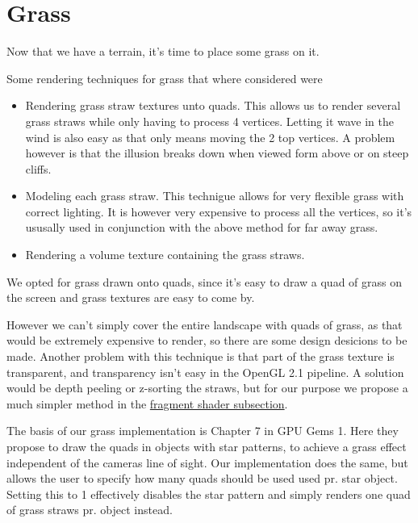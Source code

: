 \chapter{Grass}


Now that we have a terrain, it's time to place some grass on it.

Some rendering techniques for grass that where considered were

\begin{itemize}
\item Rendering grass straw textures unto quads. This allows us to
  render several grass straws while only having to process 4
  vertices. Letting it wave in the wind is also easy as that only
  means moving the 2 top vertices. A problem however is that the
  illusion breaks down when viewed form above or on steep cliffs.
\item Modeling each grass straw. This technigue allows for very
  flexible grass with correct lighting. It is however very expensive
  to process all the vertices, so it's ususally used in conjunction
  with the above method for far away grass.
\item Rendering a volume texture containing the grass straws.
\end{itemize}

We opted for grass drawn onto quads, since it's easy to draw a quad of
grass on the screen and grass textures are easy to come by.

However we can't simply cover the entire landscape with quads of
grass, as that would be extremely expensive to render, so there are
some design desicions to be made. Another problem with this technique
is that part of the grass texture is transparent, and transparency
isn't easy in the OpenGL 2.1 pipeline. A solution would be depth
peeling or z-sorting the straws, but for our purpose we propose a much
simpler method in the \hyperref[sec:grassFrag]{fragment shader
  subsection}.


The basis of our grass implementation is Chapter 7 in GPU Gems 1. Here
they propose to draw the quads in objects with star patterns, to
achieve a grass effect independent of the cameras line of sight. Our
implementation does the same, but allows the user to specify how many
quads should be used used pr. star object. Setting this to 1
effectively disables the star pattern and simply renders one quad of
grass straws pr. object instead.

